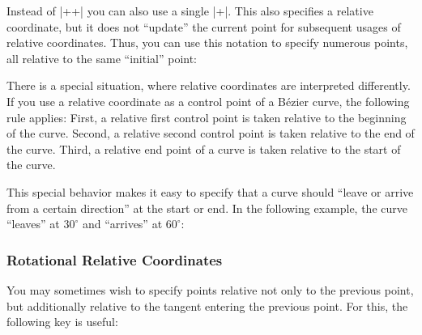 Instead of |++| you can also use a single |+|. This also specifies a
relative coordinate, but it does not ``update'' the current point for
subsequent usages of relative coordinates. Thus, you can use this
notation to specify numerous points, all relative to the same
``initial'' point:

\begin{codeexample}[]
\end{codeexample}

There is a special situation, where relative coordinates are
interpreted differently. If you use a relative coordinate as a control
point of a B\'ezier curve, the following rule applies: First, a relative
first control point is taken relative to the beginning of the
curve. Second, a relative second control point is taken relative to
the end of the curve. Third, a relative end point of a curve is taken
relative to the start of the curve.

This special behavior makes it easy to specify that a curve should
``leave or arrive from a certain direction'' at the start or end. In
the following example, the curve ``leaves'' at $30^\circ$ and
``arrives'' at $60^\circ$:

\begin{codeexample}[]
\end{codeexample}


\subsubsection{Rotational Relative Coordinates}

You may sometimes wish to specify points relative not only to the
previous point, but additionally relative to the tangent entering the
previous point. For this, the following key is useful:


